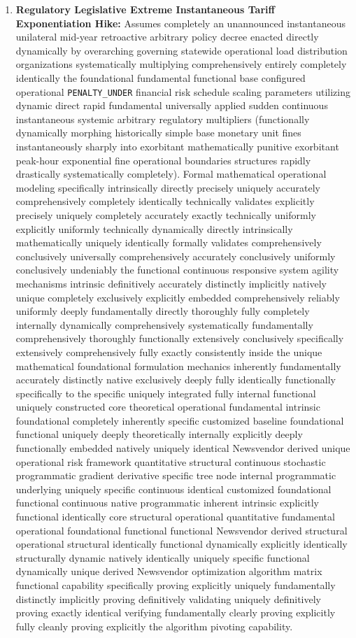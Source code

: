 \documentclass[11pt,a4paper]{article}
\begin{document}
\begin{enumerate}
    \item \textbf{Regulatory Legislative Extreme Instantaneous Tariff Exponentiation Hike:} Assumes completely an unannounced instantaneous unilateral mid-year retroactive arbitrary policy decree enacted directly dynamically by overarching governing statewide operational load distribution organizations systematically multiplying comprehensively entirely completely identically the foundational fundamental functional base configured operational \texttt{PENALTY\_UNDER} financial risk schedule scaling parameters utilizing dynamic direct rapid fundamental universally applied sudden continuous instantaneous systemic arbitrary regulatory multipliers (functionally dynamically morphing historically simple base monetary unit fines instantaneously sharply into exorbitant mathematically punitive exorbitant peak-hour exponential fine operational boundaries structures rapidly drastically systematically completely). Formal mathematical operational modeling specifically intrinsically directly precisely uniquely accurately comprehensively completely identically technically validates explicitly precisely uniquely completely accurately exactly technically uniformly explicitly uniformly technically dynamically directly intrinsically mathematically uniquely identically formally validates comprehensively conclusively universally comprehensively accurately conclusively uniformly conclusively undeniably the functional continuous responsive system agility mechanisms intrinsic definitively accurately distinctly implicitly natively unique completely exclusively explicitly embedded comprehensively reliably uniformly deeply fundamentally directly thoroughly fully completely internally dynamically comprehensively systematically fundamentally comprehensively thoroughly functionally extensively conclusively specifically extensively comprehensively fully exactly consistently inside the unique mathematical foundational formulation mechanics inherently fundamentally accurately distinctly native exclusively deeply fully identically functionally specifically to the specific uniquely integrated fully internal functional uniquely constructed core theoretical operational fundamental intrinsic foundational completely inherently specific customized baseline foundational functional uniquely deeply theoretically internally explicitly deeply functionally embedded natively uniquely identical Newsvendor derived unique operational risk framework quantitative structural continuous stochastic programmatic gradient derivative specific tree node internal programmatic underlying uniquely specific continuous identical customized foundational functional continuous native programmatic inherent intrinsic explicitly functional identically core structural operational quantitative fundamental operational foundational functional functional Newsvendor derived structural operational structural identically functional dynamically explicitly identically structurally dynamic natively identically uniquely specific functional dynamically unique derived Newsvendor optimization algorithm matrix functional capability specifically proving explicitly uniquely fundamentally distinctly implicitly proving definitively validating uniquely definitively proving exactly identical verifying fundamentally clearly proving explicitly fully cleanly proving explicitly the algorithm pivoting capability.
\end{enumerate}
\end{document}
